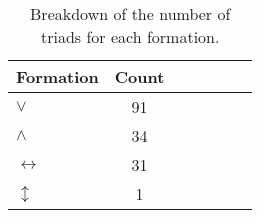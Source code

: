 \begin{table}
\centering
\caption{Breakdown of the number of triads for each formation.}
\label{tab:counts_triads_formations}
\begin{tabular}{lcccccc}
\toprule
Formation & Count \\
\midrule
$\vee$ & 91 \\
$\wedge$ & 34 \\
$\longleftrightarrow$ & 31 \\
$\updownarrow$ & 1 \\
\bottomrule
\end{tabular}
\end{table}
